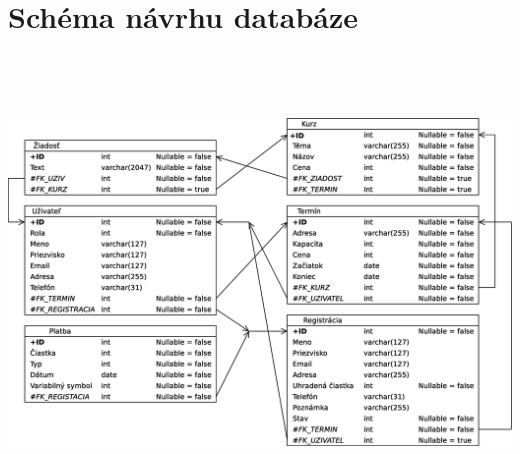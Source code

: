 \documentclass[12pt,a4paper,titlepage,final]{report}
\begin{document}
\chapter{Schéma návrhu databáze}
		\begin{center}
			\captionsetup{type=figure}
			\includegraphics[height=12cm]{img/schema_db.eps}
		\end{center}
\end{document}
